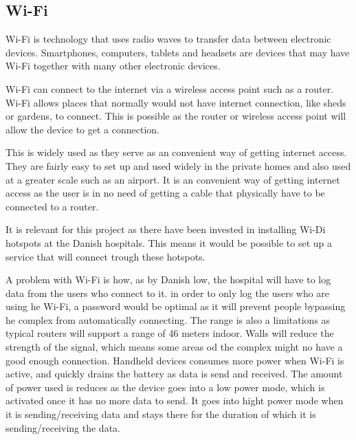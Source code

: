 \subsection{Wi-Fi} \label{wifitech}
Wi-Fi is  technology that uses radio waves to transfer data between electronic devices. Smartphones, computers, tablets and headsets are devices that may have Wi-Fi together with many other electronic devices\cite{wifi_devices}.

Wi-Fi can connect to the internet via a wireless access point such as a router. Wi-Fi allows places that normally would not have internet connection, like sheds or gardens, to connect. This is possible as the router or wireless access point will allow the device to get a connection.

This is widely used as they serve as an convenient way of getting internet access. They are fairly easy to set up and used widely in the private homes and also used at a greater scale such as an airport\cite{wifi_works}. It is an convenient way of getting internet access as the user is in no need of getting a cable that physically have to be connected to a router.

It is relevant for this project as there have been invested in installing Wi-Di hotspots at the Danish hospitals\cite{wifi_hospi}. This means it would be possible to set up a service that will connect trough these hotspots.

A problem with Wi-Fi is how, as by Danish low, the hospital will have to log data from the users who connect to it\cite{wifi_log}. in order to only log the users who are using he Wi-Fi, a password would be optimal as it will prevent people bypassing he complex from automatically connecting. The range is also a limitations as typical routers will support a range of 46 meters indoor\cite{wifi_range}. Walls will reduce the strength of the signal, which means some areas od the complex might no have a good enough connection\cite{wifi_wall}. Handheld devices consumes more power when Wi-Fi is active, and quickly drains the battery as data is send and received\cite{wifi_batt}. The amount of power used is reduces as the device goes into a low power mode, which is activated once it has no more data to send. It goes into hight power mode when it is sending/receiving data and stays there for the duration of which it is sending/receiving the data.